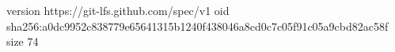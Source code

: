 version https://git-lfs.github.com/spec/v1
oid sha256:a0dc9952c838779e65641315b1240f438046a8cd0c7c05f91c05a9cbd82ac58f
size 74
